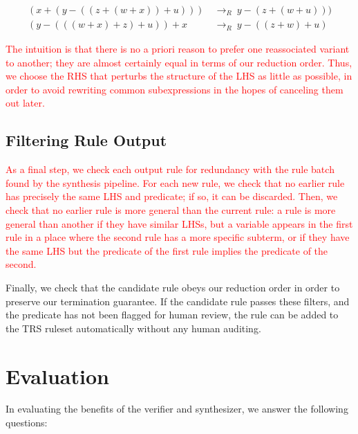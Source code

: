 \documentclass[acmsmall,review]{acmart}\settopmatter{printfolios=true,printccs=false,printacmref=false}
\newcommand{\modified}[1]{\textcolor{red}{{#1}}}
\newcommand{\rewrites}[0]{\:\rightarrow_{R}\:}
\begin{document}
\begin{equation*}
\begin{split}
(x + (y - ((z + (w + x)) + u))) & \rewrites y - (z + (w + u))) \\
(y - (((w + x) + z) + u)) + x & \rewrites y - ((z + w) + u)
\end{split}
\end{equation*}

\modified{The intuition is that there is no a priori reason 
to prefer one reassociated variant to another; they are almost certainly equal in 
terms of our reduction order. Thus, we choose the RHS that perturbs the structure of the 
LHS as little as possible, in order to avoid rewriting common subexpressions in the hopes
of canceling them out later.}


\subsection{Filtering Rule Output}
\label{sec:filtering}
\modified{As a final step, we check each output rule for redundancy with the rule batch found
by the synthesis pipeline. For each new rule, we check
that no earlier rule has precisely the same LHS and predicate; if so, it can be discarded.
Then, we check that no earlier rule is more general than the current rule: a rule is more 
general than another if they have similar LHSs, but a variable appears in the first rule 
in a place where the second rule has a more specific subterm, or if they have the same LHS
but the predicate of the first rule implies the predicate of the second.}

Finally, we
check that the candidate rule obeys our reduction order in order to
preserve our termination guarantee. If the candidate rule passes these
filters, and the predicate has not been flagged for human review, the
rule can be added to the TRS ruleset automatically without any human
auditing.

\section{Evaluation}
\label{sec:evaluation}

\newcommand{\PercentPossibleToSynth}{69\%}
\newcommand{\NumRulesInCorrectnessExperiment}{321}
\newcommand{\PercentRulesResynthesized}{58\%}

In evaluating the benefits of the verifier and synthesizer, we answer the following questions:
\end{document}
